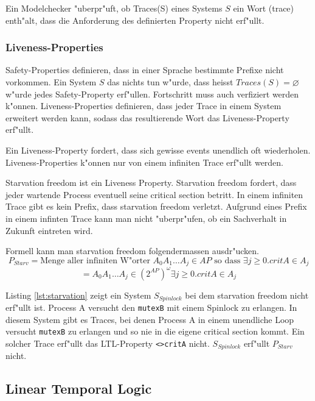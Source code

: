 \documentclass[11pt,twoside,a4paper]{article}
\begin{document}
Ein Modelchecker "uberpr"uft, ob Traces(S) eines Systems $S$ ein Wort (trace) enth"alt, dass die Anforderung des definierten Property nicht erf"ullt.

\subsubsection{Liveness-Properties}
\label{sec:liveness}

Safety-Properties definieren, dass in einer Sprache bestimmte Prefixe nicht vorkommen. Ein System $S$ das nichts tun w"urde, dass heisst $Traces(S)=\varnothing$ w"urde jedes Safety-Property erf"ullen. Fortschritt muss auch verfiziert werden k"onnen. Liveness-Properties definieren, dass jeder Trace in einem System erweitert werden kann, sodass das resultierende Wort das Liveness-Property erf"ullt.

Ein Liveness-Property fordert, dass sich gewisse events unendlich oft wiederholen. Liveness-Properties k"onnen nur von einem infiniten Trace erf"ullt werden. 

Starvation freedom ist ein Liveness Property. Starvation freedom fordert, dass jeder wartende Process eventuell seine critical section betritt. In einem infiniten Trace gibt es kein Prefix, dass starvation freedom verletzt. Aufgrund eines Prefix in einem infinten Trace kann man nicht "uberpr"ufen, ob ein Sachverhalt in Zukunft eintreten wird.

Formell kann man starvation freedom folgendermassen ausdr"ucken.
\[
P_{Starv} = \text{Menge aller infiniten W"orter } A_0 A_1 \dots A_j \in AP \text{ so dass }\exists j \geq 0. critA \in A_j
\]
\[
 = { A_0 A_1 \dots A_j \in (2^{AP})^{\omega} \exists j \geq 0. critA \in A_j}
\]

Listing \ref{lst:starvation} zeigt ein System $S_{Spinlock}$ bei dem starvation freedom nicht erf"ullt ist. Process A versucht den \verb|mutexB| mit einem Spinlock zu erlangen. In diesem System gibt es Traces, bei denen Process A in einem unendliche Loop versucht \verb|mutexB| zu erlangen und so nie in die eigene critical section kommt. Ein solcher Trace erf"ullt das LTL-Property \verb|<>critA| nicht. $S_{Spinlock}$ erf"ullt $P_{Starv}$ nicht.



\subsection{Linear Temporal Logic}
\label{sec:lineartemporallogic}
\end{document}
